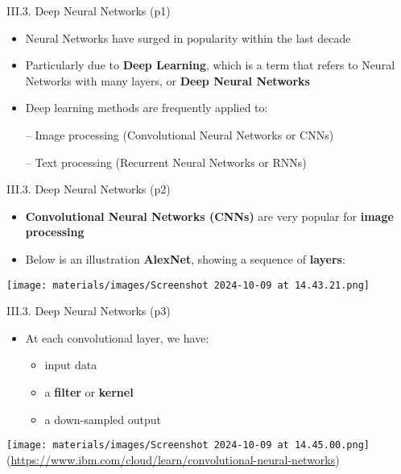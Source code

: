 \documentclass[handout]{beamer}
\newcommand{\strong}[1]{\textbf{\color{teal} #1}}
\newcommand{\stronger}[1]{\textbf{\color{purple} #1}}
\begin{document}
\begin{frame}{III.3. Deep Neural Networks (p1)}
\begin{itemize}
\item Neural Networks have surged in popularity within the last decade
\item[]
\item Particularly due to \stronger{Deep Learning}, which is a term that refers to Neural Networks with many layers, or \stronger{Deep Neural Networks}
\item[]
\item Deep learning methods are frequently applied to:
\item[--] Image processing (Convolutional Neural Networks or CNNs)
\item[--] Text processing (Recurrent Neural Networks or RNNs)
\end{itemize}
\end{frame}
\begin{frame}{III.3. Deep Neural Networks (p2)}
\begin{itemize}
\item \stronger{Convolutional Neural Networks (CNNs)} are very popular for \strong{image processing}
\item Below is an illustration \textbf{AlexNet}, showing a sequence of \strong{layers}:
\end{itemize}
\begin{center}
\texttt{[image: materials/images/Screenshot 2024-10-09 at 14.43.21.png]}\\
\cite{krizhevsky-et-al-cacm:2017}
\end{center}
\end{frame}
\begin{frame}{III.3. Deep Neural Networks (p3)}
\begin{itemize}
\item At each convolutional layer, we have:
	\begin{itemize}
	\item input data
	\item a \stronger{filter} or \stronger{kernel}
	\item a down-sampled output
	\end{itemize}
\end{itemize}
\begin{center}
\texttt{[image: materials/images/Screenshot 2024-10-09 at 14.45.00.png]}\\
{\footnotesize (\url{https://www.ibm.com/cloud/learn/convolutional-neural-networks})}
\end{center}
\end{frame}
\end{document}
